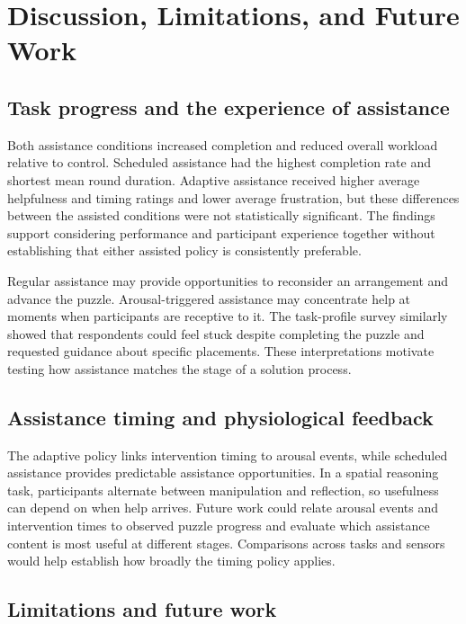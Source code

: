 \documentclass[sigconf,anonymous]{aamas}
\begin{document}
\section{Discussion, Limitations, and Future Work}

\subsection{Task progress and the experience of assistance}

Both assistance conditions increased completion and reduced overall workload relative to control. Scheduled assistance had the highest completion rate and shortest mean round duration. Adaptive assistance received higher average helpfulness and timing ratings and lower average frustration, but these differences between the assisted conditions were not statistically significant. The findings support considering performance and participant experience together without establishing that either assisted policy is consistently preferable.

Regular assistance may provide opportunities to reconsider an arrangement and advance the puzzle. Arousal-triggered assistance may concentrate help at moments when participants are receptive to it. The task-profile survey similarly showed that respondents could feel stuck despite completing the puzzle and requested guidance about specific placements. These interpretations motivate testing how assistance matches the stage of a solution process.

\subsection{Assistance timing and physiological feedback}

The adaptive policy links intervention timing to arousal events, while scheduled assistance provides predictable assistance opportunities. In a spatial reasoning task, participants alternate between manipulation and reflection, so usefulness can depend on when help arrives. Future work could relate arousal events and intervention times to observed puzzle progress and evaluate which assistance content is most useful at different stages. Comparisons across tasks and sensors would help establish how broadly the timing policy applies.

\subsection{Limitations and future work}
\end{document}
